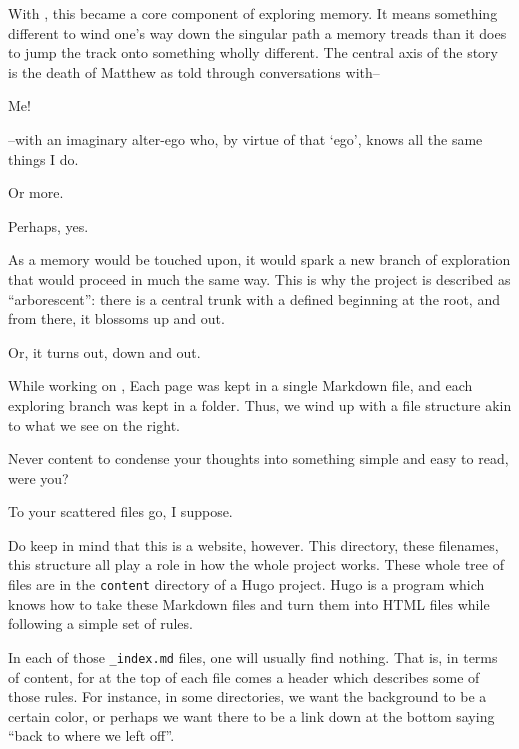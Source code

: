 \begin{paracol}{2}
\begin{leftcolumn}
With \allyId, this became a core component of exploring memory. It means something different to wind one's way down the singular path a memory treads than it does to jump the track onto something wholly different. The central axis of the story is the death of Matthew as told through conversations with--

\begin{ally}
  Me!
\end{ally}
--with an imaginary alter-ego who, by virtue of that `ego', knows all the same things I do.

\begin{ally}
  Or more.
\end{ally}
Perhaps, yes.

As a memory would be touched upon, it would spark a new branch of exploration that would proceed in much the same way. This is why the project is described as ``arborescent'': there is a central trunk with a defined beginning at the root, and from there, it blossoms up and out.

Or, it turns out, down and out.
\newpage

\end{leftcolumn}
\begin{rightcolumn*}

\end{rightcolumn*}
\begin{leftcolumn}
\noindent While working on \allyId, Each page was kept in a single Markdown file, and each exploring branch was kept in a folder. Thus, we wind up with a file structure akin to what we see on the right.

\begin{ally}
  Never content to condense your thoughts into something simple and easy to read, were you?
\end{ally}
To your scattered files go, I suppose.

Do keep in mind that this is a website, however. This directory, these filenames, this structure all play a role in how the whole project works. These whole tree of files are in the \texttt{content} directory of a Hugo project. Hugo is a program which knows how to take these Markdown files and turn them into HTML files while following a simple set of rules.

In each of those \texttt{\_index.md} files, one will usually find nothing. That is, in terms of content, for at the top of each file comes a header which describes some of those rules. For instance, in some directories, we want the background to be a certain color, or perhaps we want there to be a link down at the bottom saying ``back to where we left off''.


\end{leftcolumn}
\end{paracol}
